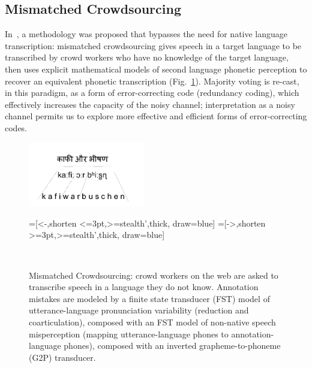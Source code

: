 \subsection{Mismatched Crowdsourcing}

In~\cite{JHJ15a}, a methodology was proposed that bypasses the need
for native language transcription: mismatched crowdsourcing gives speech in a
target language to be transcribed by crowd workers who have no
knowledge of the target language, then uses explicit mathematical
models of second language phonetic perception to recover an equivalent
phonetic transcription (Fig.~\ref{fig:h2e_eg2}).  Majority voting is
re-cast, in this paradigm, as a form of error-correcting code
(redundancy coding), which effectively increases the capacity of the
noisy channel; interpretation as a noisy channel permits us to explore
more effective and efficient forms of error-correcting codes.

\begin{figure}[b!]\setlength{\textfloatsep}{3mm}
\centerline{\includegraphics[width=2in]{../figs/h2e_eg1.png}}
\begin{center}
  =[<-,shorten <=3pt,>=stealth',thick, draw=blue]
  =[->,shorten >=3pt,>=stealth',thick, draw=blue]
  \\
\end{center}
\setlength{\abovecaptionskip}{0pt}
\caption{Mismatched Crowdsourcing: crowd workers on the web are asked
  to transcribe speech in a language they do not know.  Annotation
  mistakes are modeled by a finite state transducer (FST) model of
  utterance-language pronunciation variability (reduction and
  coarticulation), composed with an FST model of non-native speech
  misperception (mapping utterance-language phones to
  annotation-language phones), composed with an inverted
  grapheme-to-phoneme (G2P) transducer.}
\label{fig:h2e_eg2}
\end{figure}

